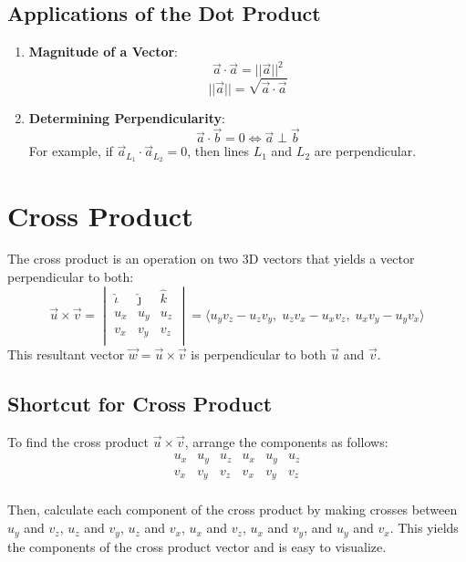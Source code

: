 \documentclass[a4paper,12pt,openany]{book}
\newcommand{\uniti}{
    \hat{\iota}
}
\newcommand{\unitj}{
    \hat{\jmath}
}
\newcommand{\unitk}{
    \hat{k}
}
\begin{document}
\subsection{Applications of the Dot Product}
\begin{enumerate}
    \item \textbf{Magnitude of a Vector}:
    \[
        \vec{a} \cdot \vec{a} = ||\vec{a}||^2
    \]
    \[
        ||\vec{a}|| = \sqrt{\vec{a} \cdot \vec{a}}
    \]

    \item \textbf{Determining Perpendicularity}:
    \[
        \vec{a} \cdot \vec{b} = 0 \iff \vec{a} \perp \vec{b}
    \]
    For example, if \(\vec{a}_{L_1} \cdot \vec{a}_{L_2} = 0\), then lines \(L_1\) and \(L_2\) are perpendicular.
\end{enumerate}

\section{Cross Product}
The cross product is an operation on two 3D vectors that yields a vector perpendicular to both:
\[
    \vec{u} \times \vec{v} = 
    \begin{vmatrix}
        \uniti & \unitj & \unitk \\
        u_x & u_y & u_z \\
        v_x & v_y & v_z \\
    \end{vmatrix} 
    = \langle u_y v_z - u_z v_y, \; u_z v_x - u_x v_z, \; u_x v_y - u_y v_x \rangle
\]
This resultant vector \(\vec{w} = \vec{u} \times \vec{v}\) is perpendicular to both \(\vec{u}\) and \(\vec{v}\).
\subsection{Shortcut for Cross Product}

To find the cross product \(\vec{u} \times \vec{v}\), arrange the components as follows:
\[
\begin{array}{|cccccc|}
    u_x & u_y & u_z & u_x & u_y & u_z \\
    v_x & v_y & v_z & v_x & v_y & v_z \\
\end{array}
\]

Then, calculate each component of the cross product by making crosses between $u_y$ and $v_z$, $u_z$ and $v_y$, $u_z$ and $v_x$, $u_x$ and $v_z$, $u_x$ and $v_y$, and $u_y$ and $v_x$. This yields the components of the cross product vector and is easy to visualize.
\end{document}

